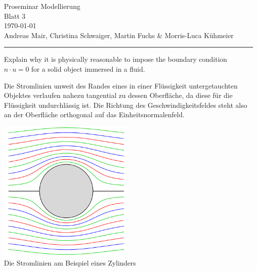 \documentclass[12pt]{exam}
\begin{document}
\begingroup  
    \centering
    \Large Proseminar Modellierung\\
    \Large Blatt 3\\[0.75em]
    \large \today\\[0.75em]
    \normalsize Andreas Mair, Christina Schwaiger, Martin Fuchs \& Morris-Luca Kühmeier\par
\endgroup

\vspace{12pt}
\hrule
\vspace{12pt}

\printanswers
\renewcommand{\solutiontitle}{\textbf{Lösung:}\enspace}

\thispagestyle{plain}

\begin{questions}

    \question Explain why it is physically reasonable to impose the boundary condition $n \cdot u = 0$ for a solid object immersed in a fluid.
    
    \begin{solution}
        Die Stromlinien unweit des Randes eines in einer Flüssigkeit untergetauchten Objektes verlaufen nahezu tangential zu dessen Oberfläche, da diese für die Flüssigkeit undurchlässig ist. Die Richtung des Geschwindigkeitsfeldes steht also an der Oberfläche orthogonal auf das Einheitsnormalenfeld.

        \centering
        \includegraphics[width=0.5\textwidth]{LaminarFlow.pdf}\\
        Die Stromlinien am Beispiel eines Zylinders
    \end{solution}
    

\end{questions}
\end{document}
